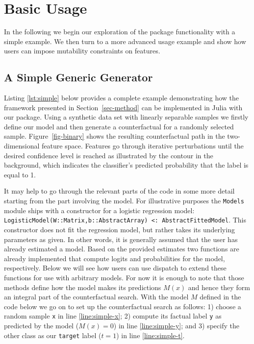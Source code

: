 \documentclass{juliacon}
\begin{document}
\hypertarget{sec-use}{%
\section{Basic Usage}\label{sec-use}}

In the following we begin our exploration of the package functionality
with a simple example. We then turn to a more advanced usage example and
show how users can impose mutability constraints on features.

\hypertarget{a-simple-generic-generator}{%
\subsection{A Simple Generic
Generator}\label{a-simple-generic-generator}}

Listing \ref{lst:simple} below provides a complete example demonstrating
how the framework presented in Section~\ref{sec-method} can be
implemented in Julia with our package. Using a synthetic data set with
linearly separable samples we firstly define our model and then generate
a counterfactual for a randomly selected sample. Figure~\ref{fig-binary}
shows the resulting counterfactual path in the two-dimensional feature
space. Features go through iterative perturbations until the desired
confidence level is reached as illustrated by the contour in the
background, which indicates the classifier's predicted probability that
the label is equal to 1.

It may help to go through the relevant parts of the code in some more
detail starting from the part involving the model. For illustrative
purposes the \texttt{Models} module ships with a constructor for a
logistic regression model:
\texttt{LogisticModel(W::Matrix,b::AbstractArray)\ \textless{}:\ AbstractFittedModel}.
This constructor does not fit the regression model, but rather takes its
underlying parameters as given. In other words, it is generally assumed
that the user has already estimated a model. Based on the provided
estimates two functions are already implemented that compute logits and
probabilities for the model, respectively. Below we will see how users
can use dispatch to extend these functions for use with arbitrary
models. For now it is enough to note that those methods define how the
model makes its predictions \(M(x)\) and hence they form an integral
part of the counterfactual search. With the model \(M\) defined in the
code below we go on to set up the counterfactual search as follows: 1)
choose a random sample \texttt{x} in line \ref{line:simple-x}; 2)
compute its factual label \texttt{y} as predicted by the model
(\(M(x)=0\)) in line \ref{line:simple-y}; and 3) specify the other class
as our \texttt{target} label (\(t=1\)) in line \ref{line:simple-t}.
\end{document}
